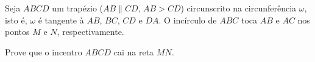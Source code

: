 Seja $ABCD$ um trapézio ($AB \parallel CD$, $AB > CD$) circunscrito na circunferência $\omega$, isto é, $\omega$ é tangente à $AB$, $BC$, $CD$ e $DA$.
O incírculo de $ABC$ toca $AB$ e $AC$ nos pontos $M$ e $N$, respectivamente.

Prove que o incentro $ABCD$ cai na reta $MN$.
